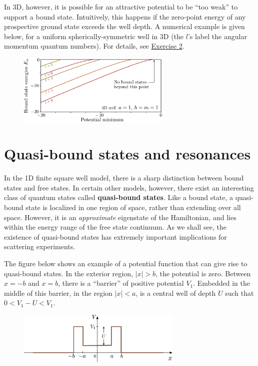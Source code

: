 \documentclass[pra,12pt]{revtex4}
\begin{document}
In 3D, however, it is possible for an attractive potential to be ``too
weak'' to support a bound state.  Intuitively, this happens if the
zero-point energy of any prospective ground state exceeds the well
depth.  A numerical example is given below, for a uniform
spherically-symmetric well in 3D (the $l$'s label the angular momentum
quantum numbers).  For details, see
\hyperref[ex:boundstate3d]{Exercise 2}.

\begin{figure}[h]
  \centering\includegraphics[width=0.65\textwidth]{boundstate3d}
\end{figure}

\section{Quasi-bound states and resonances}

In the 1D finite square well model, there is a sharp distinction
between bound states and free states.  In certain other models,
however, there exist an interesting class of quantum states called
\textbf{quasi-bound states}.  Like a bound state, a quasi-bound state
is localized in one region of space, rather than extending over all
space.  However, it is an \textit{approximate} eigenstate of the
Hamiltonian, and lies within the energy range of the free state
continuum.  As we shall see, the existence of quasi-bound states has
extremely important implications for scattering experiments.

The figure below shows an example of a potential function that can
give rise to quasi-bound states.  In the exterior region, $|x| > b$,
the potential is zero.  Between $x = -b$ and $x = b$, there is a
``barrier'' of positive potential $V_1$.  Embedded in the middle of
this barrier, in the region $|x| < a$, is a central well of depth $U$
such that $0 < V_1 - U < V_1$.

\begin{figure}[h]
  \centering\includegraphics[width=0.7\textwidth]{resonancewell}
\end{figure}
\end{document}
